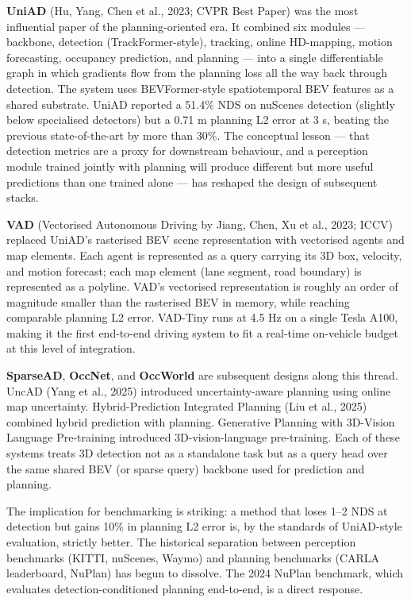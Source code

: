 \documentclass{article}
\begin{document}
\textbf{UniAD} (Hu, Yang, Chen et al., 2023; CVPR Best Paper) was the most influential paper of the planning-oriented era. It combined six modules --- backbone, detection (TrackFormer-style), tracking, online HD-mapping, motion forecasting, occupancy prediction, and planning --- into a single differentiable graph in which gradients flow from the planning loss all the way back through detection. The system uses BEVFormer-style spatiotemporal BEV features as a shared substrate. UniAD reported a 51.4\% NDS on nuScenes detection (slightly below specialised detectors) but a 0.71 m planning L2 error at 3 s, beating the previous state-of-the-art by more than 30\%. The conceptual lesson --- that detection metrics are a proxy for downstream behaviour, and a perception module trained jointly with planning will produce different but more useful predictions than one trained alone --- has reshaped the design of subsequent stacks.

\textbf{VAD} (Vectorised Autonomous Driving by Jiang, Chen, Xu et al., 2023; ICCV) replaced UniAD's rasterised BEV scene representation with vectorised agents and map elements. Each agent is represented as a query carrying its 3D box, velocity, and motion forecast; each map element (lane segment, road boundary) is represented as a polyline. VAD's vectorised representation is roughly an order of magnitude smaller than the rasterised BEV in memory, while reaching comparable planning L2 error. VAD-Tiny runs at 4.5 Hz on a single Tesla A100, making it the first end-to-end driving system to fit a real-time on-vehicle budget at this level of integration.

\textbf{SparseAD}, \textbf{OccNet}, and \textbf{OccWorld} are subsequent designs along this thread. UncAD (Yang et al., 2025) introduced uncertainty-aware planning using online map uncertainty. Hybrid-Prediction Integrated Planning (Liu et al., 2025) combined hybrid prediction with planning. Generative Planning with 3D-Vision Language Pre-training \citep{li2025delvingintothesecr} introduced 3D-vision-language pre-training. Each of these systems treats 3D detection not as a standalone task but as a query head over the same shared BEV (or sparse query) backbone used for prediction and planning.

The implication for benchmarking is striking: a method that loses 1--2 NDS at detection but gains 10\% in planning L2 error is, by the standards of UniAD-style evaluation, strictly better. The historical separation between perception benchmarks (KITTI, nuScenes, Waymo) and planning benchmarks (CARLA leaderboard, NuPlan) has begun to dissolve. The 2024 NuPlan benchmark, which evaluates detection-conditioned planning end-to-end, is a direct response.
\end{document}
